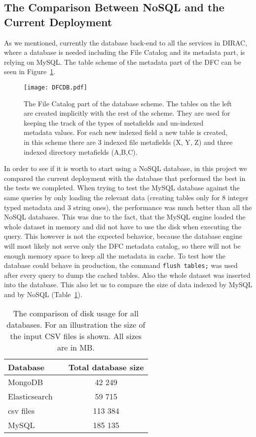 \subsection{The Comparison Between NoSQL and the Current Deployment}

As we mentioned, currently the database back-end to all the services in DIRAC, where a database is needed including the File 
Catalog and its metadata part, is relying on MySQL. The table scheme of the metadata part of the DFC can be seen 
in Figure~\ref{fig:DFCUML}.

\begin{figure}[h]
	\centering
	\texttt{[image: DFCDB.pdf]}
	\caption{The File Catalog part of the database scheme. The tables on the left are created implicitly with the
	rest of the scheme. They are used  for keeping the track of the types of metafields and un-indexed  metadata 
	values. For each new indexed field a new table is created, in this scheme there are 3 indexed file metafields
	(X, Y, Z) and three indexed directory metafields (A,B,C).}
	\label{fig:DFCUML}
\end{figure}

In order to see if it is worth to start using a NoSQL database, in this project we compared the current deployment  
with the database that performed the
best in the tests we completed. When trying to test the MySQL database against the same queries 
by only loading the relevant data (creating tables only for 8 integer typed metadata and 3 string ones), the 
performance was much better than all the NoSQL databases. This was due to the fact, that the MySQL engine loaded
the whole dataset in memory and did not have to use the disk when executing the query. This however is not the expected 
behavior, because the database engine will most likely not serve only the DFC metadata catalog, so there will not
be enough memory space to keep all the metadata in cache. To test how the database could behave in production, the 
command \texttt{flush tables;} was used after every query to dump the cached tables. Also the whole dataset
was inserted into the database. This also let us to compare the size of data indexed by MySQL and by NoSQL (Table~\ref{tab:allDbSizes}). 

\begin{table}[t]
\centering
\begin{tabular}{lcc}
\toprule
\textbf{Database}      & & \textbf{Total database size}  \\ 
\midrule
MongoDB                & & 42 249                        \\ 
Elasticsearch          & & 59 715                        \\ 
csv files              & & 113 384                       \\ 
MySQL                  & & 185 135                       \\ 
\toprule
\end{tabular}
\caption{The comparison of disk usage for all databases. For an illustration the size of the input CSV files is
shown. All sizes are in MB.}
\label{tab:allDbSizes}
\end{table}

